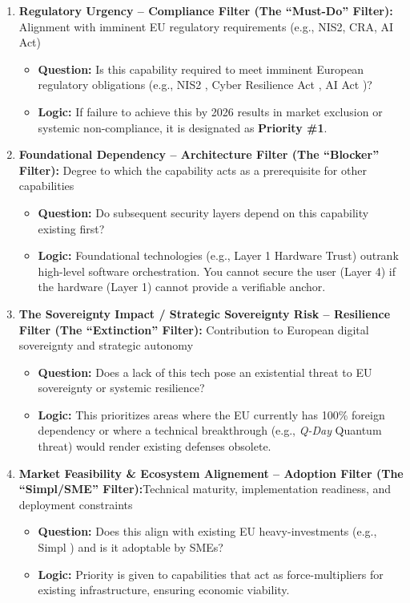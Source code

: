 \documentclass{ieeeaccess}
\begin{document}
\begin{enumerate}
     \item \textbf{Regulatory Urgency -- Compliance Filter (The ``Must-Do''  Filter):} Alignment with imminent EU regulatory requirements (e.g., NIS2, CRA, AI Act)
    \begin{itemize}
        \item \textbf{Question:} Is this capability required to meet imminent European regulatory obligations (e.g., NIS2 \cite{nis2}, Cyber Resilience Act \cite{cra}, AI Act \cite{aiact})?
        \item \textbf{Logic:} If failure to achieve this by 2026 results in market exclusion or systemic non-compliance, it is designated as \textbf{Priority \#1}.
    \end{itemize}
    
    
    \item \textbf{Foundational Dependency -- Architecture Filter (The ``Blocker''  Filter):} Degree to which the capability acts as a prerequisite for other capabilities
    \begin{itemize}
        \item \textbf{Question:} Do subsequent security layers depend on this capability existing first?
        \item \textbf{Logic:} Foundational technologies (e.g., Layer 1 Hardware Trust) outrank high-level software orchestration. You cannot secure the user (Layer 4) if the hardware (Layer 1) cannot provide a verifiable anchor.
    \end{itemize}
    
    
       \item \textbf{The Sovereignty Impact / Strategic Sovereignty Risk -- Resilience Filter (The ``Extinction''  Filter):} Contribution to European digital sovereignty and strategic autonomy

    \begin{itemize}
        \item \textbf{Question:} Does a lack of this tech pose an existential threat to EU sovereignty or systemic resilience?
        \item \textbf{Logic:} This prioritizes areas where the EU currently has 100\% foreign dependency or where a technical breakthrough (e.g., \textit{Q-Day} Quantum threat) would render existing defenses obsolete.
    \end{itemize}   
    \item \textbf{Market Feasibility \& Ecosystem Alignement -- Adoption Filter (The ``Simpl/SME''  Filter):}Technical maturity, implementation readiness, and deployment constraints
    \begin{itemize}
        \item \textbf{Question:} Does this align with existing EU heavy-investments (e.g., Simpl \cite{cloud_edge_roadmap}) and is it adoptable by SMEs?
        \item \textbf{Logic:} Priority is given to capabilities that act as force-multipliers for existing infrastructure, ensuring economic viability.
    \end{itemize}
\end{enumerate}
\end{document}
